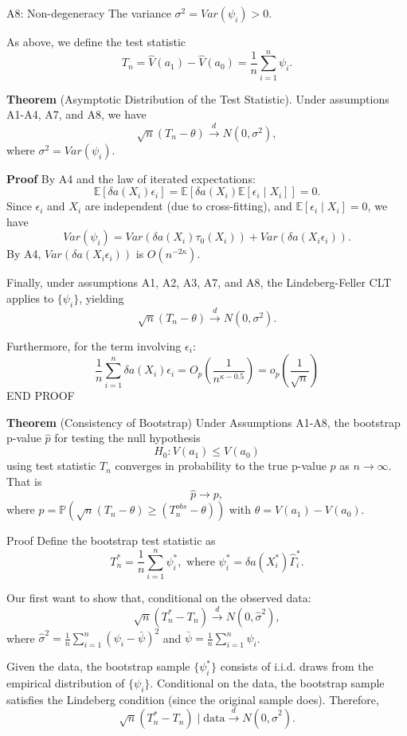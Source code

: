 \documentclass[
]{article}
\begin{document}
A8: Non-degeneracy The variance \(\sigma^2 = Var(\psi _{i})>0\).

As above, we define the test statistic \[
T_{n} = \hat{V}(a_{1}) - \hat{V}(a_{0}) = \frac{1}{n}\sum_{i=1}^n \psi _{i}.
\]

\textbf{Theorem} (Asymptotic Distribution of the Test Statistic). Under
assumptions A1-A4, A7, and A8, we have \[
\sqrt{n}(T_n - \theta) \xrightarrow{d} N(0, \sigma^2),
\] where \(\sigma^2 = Var(\psi _{i})\).

\textbf{Proof} By A4 and the law of iterated expectations: \[
\mathbb{E}[\delta a(X_{i})\epsilon _{i}] = \mathbb{E}[\delta a(X_{i})\mathbb{E}[\epsilon _{i}\mid X_{i}]] = 0.
\] Since \(\epsilon _{i}\) and \(X_{i}\) are independent (due to
cross-fitting), and \(\mathbb{E}[\epsilon _{i} \mid X_{i}] = 0\), we
have \[
Var(\psi _{i}) = Var(\delta a(X_{i})\tau_{0}(X_{i})) + Var(\delta a(X_{i}\epsilon _{i})).
\] By A4, \(Var(\delta a(X_{i}\epsilon _{i}))\) is \(O(n^{-2\kappa})\).

Finally, under assumptions A1, A2, A3, A7, and A8, the Lindeberg-Feller
CLT applies to \(\{ \psi _{i} \}\), yielding \[
\sqrt{ n }(T_{n} - \theta) \xrightarrow{d} N(0, \sigma^2).
\]

Furthermore, for the term involving \(\epsilon _{i}\): \[
\frac{1}{n}\sum_{i=1}^n \delta a(X_{i})\epsilon _{i} = O_{p}\left( \frac{1}{n^{\kappa-0.5}} \right) = o_{p}\left( \frac{1}{\sqrt{ n }} \right)
\] END PROOF

\textbf{Theorem} (Consistency of Bootstrap) Under Assumptions A1-A8, the
bootstrap p-value \(\hat{p}\) for testing the null hypothesis \[
H_{0}: V(a_{1}) \leq V(a_{0})
\] using test statistic \(T_{n}\) converges in probability to the true
p-value \(p\) as \(n \to \infty\). That is \[
\hat{p} \to p,
\] where
\(p = \mathbb{P}(\sqrt{ n }(T_{n} - \theta) \geq (T^{obs}_{n} - \theta))\)
with \(\theta = V(a_{1}) - V(a_{0})\).

Proof Define the bootstrap test statistic as \[
T^*_{n} = \frac{1}{n} \sum_{i=1}^n \psi _{i}^*, \text{   where } \psi^*_{i} = \delta a(X_{i}^*)\hat{\Gamma}_{i}^*.
\]

Our first want to show that, conditional on the observed data: \[
\sqrt{ n }(T^*_{n} - T_{n}) \xrightarrow{d} N(0, \hat{\sigma}^2),
\] where
\(\hat{\sigma}^2 = \frac{1}{n} \sum_{i=1}^n (\psi _{i} - \bar{\psi})^2\)
and \(\bar{\psi} = \frac{1}{n}\sum_{i=1}^n \psi _{i}\).

Given the data, the bootstrap sample \(\{ \psi _{i}^* \}\) consists of
i.i.d. draws from the empirical distribution of \(\{ \psi _{i} \}\).
Conditional on the data, the bootstrap sample satisfies the Lindeberg
condition (since the original sample does). Therefore, \[
\sqrt{ n }(T^*_{n} - T_{n}) \mid \text{data} \xrightarrow{d} N(0, \hat{\sigma}^2).
\]
\end{document}
